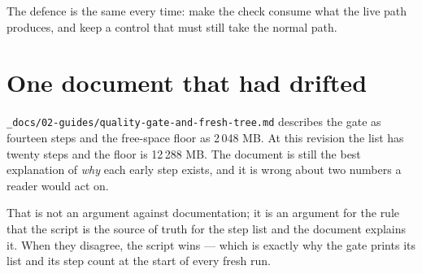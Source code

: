 The defence is the same every time: make the check consume what the live path produces, and
keep a control that must still take the normal path.

\section{One document that had drifted}

\texttt{\_docs/02-guides/quality-gate-and-fresh-tree.md} describes the gate as fourteen steps
and the free-space floor as 2\,048 MB. At this revision the list has twenty steps and the
floor is 12\,288 MB. The document is still the best explanation of \emph{why} each early step
exists, and it is wrong about two numbers a reader would act on.

That is not an argument against documentation; it is an argument for the rule that the script
is the source of truth for the step list and the document explains it. When they disagree, the
script wins --- which is exactly why the gate prints its list and its step count at the start
of every fresh run.
